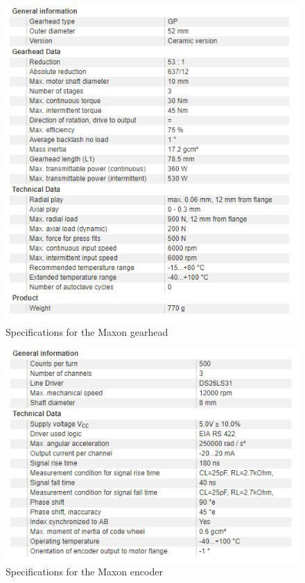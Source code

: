 \documentclass[12pt]{report}
\begin{document}
		\begin{figure}[h] 
		\centering
		\includegraphics[width=\linewidth]{gear_spec}
		\caption{Specifications for the Maxon gearhead}
		\label{fig:gear_spec}
	\end{figure}
	
			\begin{figure}[h] 
		\centering
		\includegraphics[width=\linewidth]{encoder_spec}
		\caption{Specifications for the Maxon encoder}
		\label{fig:encoder_spec}
	\end{figure}
	
\end{document}
